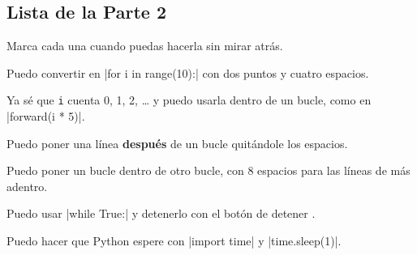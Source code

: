 \subsection*{Lista de la Parte 2}
Marca cada una cuando puedas hacerla sin mirar atrás.

\tick Puedo convertir  en \py|for i in range(10):| con dos puntos y cuatro espacios.\par
\tick Ya sé que \texttt{i} cuenta 0, 1, 2, \ldots{} y puedo usarla dentro de un bucle, como en \py|forward(i * 5)|.\par
\tick Puedo poner una línea \textbf{después} de un bucle quitándole los espacios.\par
\tick Puedo poner un bucle dentro de otro bucle, con 8 espacios para las líneas de más adentro.\par
\tick Puedo usar \py|while True:| y detenerlo con el botón de detener \stopbtn.\par
\tick Puedo hacer que Python espere con \py|import time| y \py|time.sleep(1)|.
